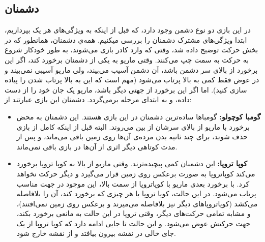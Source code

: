 \documentclass{utap}
\begin{document}
	\subsection{دشمنان}
در این بازی دو نوع دشمن وجود دارد، که قبل از اینکه به ویژگی‌های هر یک بپردازیم، ابتدا ویژگی‌های مشترک دشمنان را بررسی میکنیم.
همه‌ي دشمنان، همانطور که در بخش حرکت توضیح داده شد، وقتی که وارد کادر بازی می‌شوند، به طور خودکار شروع به حرکت به سمت چپ می‌کنند.
وقتی ماریو به یکی از دشمنان برخورد کند، اگر این برخورد از بالای سر دشمن باشد، آن دشمن آسیب می‌بیند، ولی ماریو آسیبی نمی‌بیند و در عوض فقط کمی به بالا پرتاب می‌شود (مهم است که این به بالا پرتاب شدن را پیاده سازی کنید). اما اگر این برخورد از جهتی دیگر باشد، ماریو یک جان خود را از دست داده، و به ابتدای مرحله برمی‌گردد. دشمنان این بازی عبارتند از:
	\begin{itemize}
		\item
\textbf{گومبا کوچولو:}
گومباها ساده‌ترین دشمنان در این بازی هستند. این دشمنان به محض برخورد با ماریو از بالای سرشان از بین می‌روند. البته قبل از اینکه کامل از بازی حذف شوند، برای چند ثانیه بدن مرده‌ی آن‌ها روی زمین باقی می‌ماند، و پس از مدت کوتاهی دیگر اثری از آن‌ها در بازی باقی نمی‌ماند.
		\item
\textbf{کوپا تروپا:}
این دشمنان کمی پیچیده‌ترند. وقتی ماریو از بالا به کوپا تروپا برخورد می‌کند کوپاتروپا به صورت برعکس روی زمین قرار می‌گیرد و دیگر حرکت نخواهد کرد. با برخورد بعدی ماریو با کوپا‌تروپا از سمت بالا، این موجود در جهت مناسب پرتاب می‌شود. در این حالت، کوپا تروپا با هر چیزی که برخورد کند، آن را بلافاصله می‌کشد (کوپاتروپاهای دیگر نیز بلافاصله می‌میرند و برعکس روی زمین نمی‌افتند)، و مشابه تمامی حرکت‌های دیگر، وقتی تروپا در این حالت به مانعی برخورد بکند، جهت حرکتش عوض می‌شود. و این حالت تا جایی ادامه دارد که کوپا تروپا از یک جای خالی در نقشه بیرون بیافتد و از نقشه خارج شود.
	\end{itemize}
\end{document}
